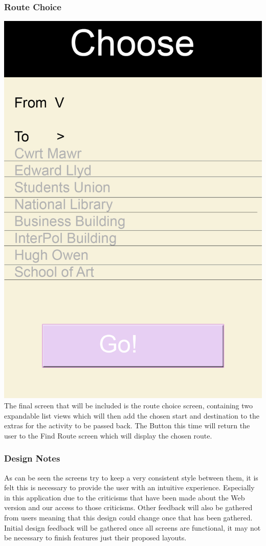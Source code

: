 \subsubsection{Route Choice}
\includegraphics[scale=0.6]{Design/Choose.png}\\
The final screen that will be included is the route choice screen, containing two expandable list views which will then add the chosen start and destination to the extras for the activity to be passed back. The Button this time will return the user to the Find Route screen which will display the chosen route. 
\subsubsection{Design Notes}
As can be seen the screens try to keep a very consistent style between them, it is felt this is necessary to provide the user with an intuitive experience. Especially in this application due to the criticisms that have been made about the Web version and our access to those criticisms. Other feedback will also be gathered from users meaning that this design could change once that has been gathered. Initial design feedback will be gathered once all screens are functional, it may not be necessary to finish features just their proposed layouts.
